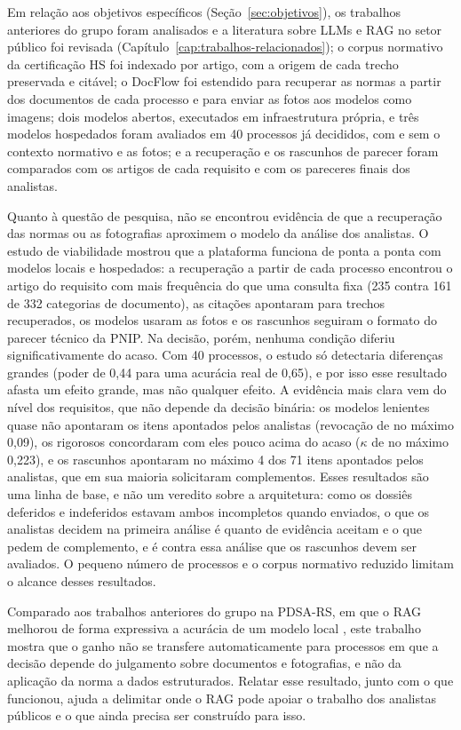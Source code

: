 Em relação aos objetivos específicos (Seção~\ref{sec:objetivos}), os trabalhos anteriores do grupo foram analisados e a literatura sobre LLMs e RAG no setor público foi revisada (Capítulo~\ref{cap:trabalhos-relacionados}); o corpus normativo da certificação HS foi indexado por artigo, com a origem de cada trecho preservada e citável; o DocFlow foi estendido para recuperar as normas a partir dos documentos de cada processo e para enviar as fotos aos modelos como imagens; dois modelos abertos, executados em infraestrutura própria, e três modelos hospedados foram avaliados em 40 processos já decididos, com e sem o contexto normativo e as fotos; e a recuperação e os rascunhos de parecer foram comparados com os artigos de cada requisito e com os pareceres finais dos analistas.

Quanto à questão de pesquisa, não se encontrou evidência de que a recuperação das normas ou as fotografias aproximem o modelo da análise dos analistas. O estudo de viabilidade mostrou que a plataforma funciona de ponta a ponta com modelos locais e hospedados: a recuperação a partir de cada processo encontrou o artigo do requisito com mais frequência do que uma consulta fixa (235 contra 161 de 332 categorias de documento), as citações apontaram para trechos recuperados, os modelos usaram as fotos e os rascunhos seguiram o formato do parecer técnico da PNIP. Na decisão, porém, nenhuma condição diferiu significativamente do acaso. Com 40 processos, o estudo só detectaria diferenças grandes (poder de 0,44 para uma acurácia real de 0,65), e por isso esse resultado afasta um efeito grande, mas não qualquer efeito. A evidência mais clara vem do nível dos requisitos, que não depende da decisão binária: os modelos lenientes quase não apontaram os itens apontados pelos analistas (revocação de no máximo 0,09), os rigorosos concordaram com eles pouco acima do acaso ($\kappa$ de no máximo 0,223), e os rascunhos apontaram no máximo 4 dos 71 itens apontados pelos analistas, que em sua maioria solicitaram complementos. Esses resultados são uma linha de base, e não um veredito sobre a arquitetura: como os dossiês deferidos e indeferidos estavam ambos incompletos quando enviados, o que os analistas decidem na primeira análise é quanto de evidência aceitam e o que pedem de complemento, e é contra essa análise que os rascunhos devem ser avaliados. O pequeno número de processos e o corpus normativo reduzido limitam o alcance desses resultados.

Comparado aos trabalhos anteriores do grupo na PDSA-RS, em que o RAG melhorou de forma expressiva a acurácia de um modelo local \cite{Montero2025}, este trabalho mostra que o ganho não se transfere automaticamente para processos em que a decisão depende do julgamento sobre documentos e fotografias, e não da aplicação da norma a dados estruturados. Relatar esse resultado, junto com o que funcionou, ajuda a delimitar onde o RAG pode apoiar o trabalho dos analistas públicos e o que ainda precisa ser construído para isso.
